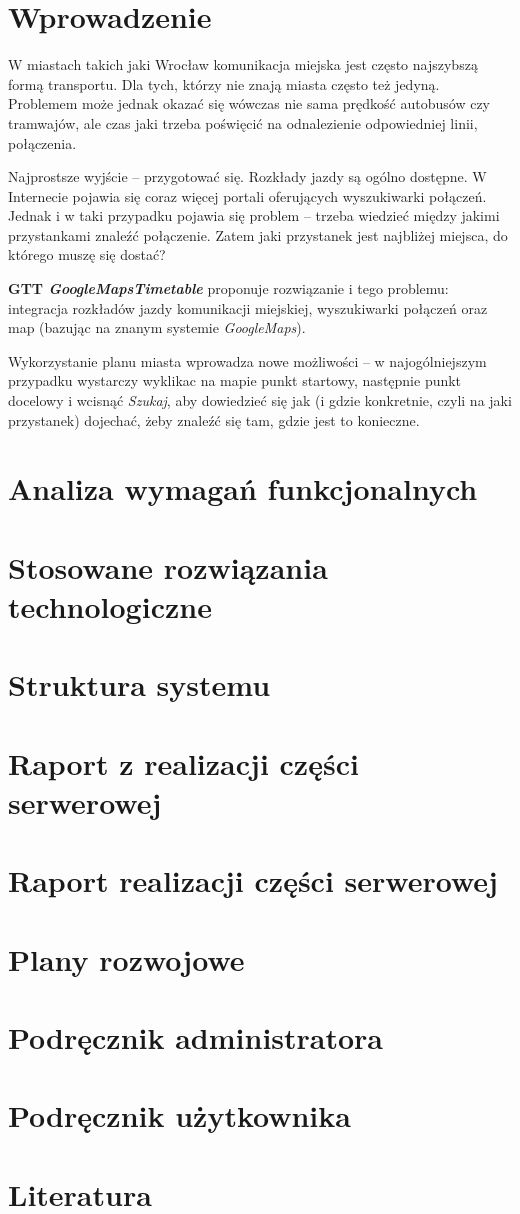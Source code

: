 \documentclass[a4paper,12pt]{article}
\begin{document}
\section*{Wprowadzenie} 


W miastach takich jaki Wrocław komunikacja miejska jest często najszybszą formą
transportu. Dla tych, którzy nie znają miasta często też jedyną. Problemem może
jednak okazać się wówczas nie sama prędkość autobusów czy tramwajów, ale czas
jaki trzeba poświęcić na odnalezienie odpowiedniej linii, połączenia. 

Najprostsze wyjście -- przygotować się. Rozkłady
jazdy są ogólno dostępne. W Internecie pojawia się coraz więcej portali
oferujących wyszukiwarki połączeń. Jednak i w taki przypadku pojawia się
problem -- trzeba wiedzieć między jakimi przystankami znaleźć połączenie. Zatem
jaki przystanek jest najbliżej miejsca, do którego muszę się dostać?

\textbf{GTT \emph{GoogleMapsTimetable}} proponuje rozwiązanie i tego problemu:
integracja rozkładów jazdy komunikacji miejskiej, wyszukiwarki połączeń oraz
map (bazując na znanym systemie \emph{GoogleMaps}).

Wykorzystanie planu miasta wprowadza nowe możliwości -- w najogólniejszym
przypadku wystarczy wyklikac na mapie punkt startowy, następnie punkt docelowy
i wcisnąć \emph{Szukaj}, aby dowiedzieć się jak (i gdzie konkretnie, czyli na
jaki przystanek) dojechać, żeby znaleźć się tam, gdzie jest to konieczne.
 

\section{Analiza wymagań funkcjonalnych}
\section{Stosowane rozwiązania technologiczne}
\section{Struktura systemu}
\section{Raport z realizacji części serwerowej}
\section{Raport realizacji  części serwerowej} 
\section{Plany rozwojowe} 
\section{Podręcznik administratora}
\section{Podręcznik użytkownika}
\section{Literatura}
\end{document}
